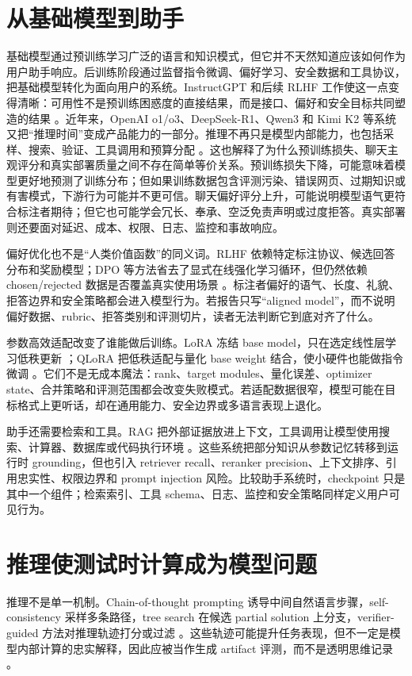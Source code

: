 \documentclass[UTF8,zihao=-4,openany]{ctexbook}
\begin{document}
\section{从基础模型到助手}
基础模型通过预训练学习广泛的语言和知识模式，但它并不天然知道应该如何作为用户助手响应。后训练阶段通过监督指令微调、偏好学习、安全数据和工具协议，把基础模型转化为面向用户的系统。InstructGPT 和后续 RLHF 工作使这一点变得清晰：可用性不是预训练困惑度的直接结果，而是接口、偏好和安全目标共同塑造的结果 \cite{ouyang2022training,bai2022training}。近年来，OpenAI o1/o3、DeepSeek-R1、Qwen3 和 Kimi K2 等系统又把“推理时间”变成产品能力的一部分。推理不再只是模型内部能力，也包括采样、搜索、验证、工具调用和预算分配 \cite{deepseek2025r1,yang2025qwen3,kimi2025k2}。这也解释了为什么预训练损失、聊天主观评分和真实部署质量之间不存在简单等价关系。预训练损失下降，可能意味着模型更好地预测了训练分布；但如果训练数据包含评测污染、错误网页、过期知识或有害模式，下游行为可能并不更可信。聊天偏好评分上升，可能说明模型语气更符合标注者期待；但它也可能学会冗长、奉承、空泛免责声明或过度拒答。真实部署则还要面对延迟、成本、权限、日志、监控和事故响应。

偏好优化也不是“人类价值函数”的同义词。RLHF 依赖特定标注协议、候选回答分布和奖励模型；DPO 等方法省去了显式在线强化学习循环，但仍然依赖 chosen/rejected 数据是否覆盖真实使用场景 \cite{rafailov2023direct}。标注者偏好的语气、长度、礼貌、拒答边界和安全策略都会进入模型行为。若报告只写“aligned model”，而不说明偏好数据、rubric、拒答类别和评测切片，读者无法判断它到底对齐了什么。

参数高效适配改变了谁能做后训练。LoRA 冻结 base model，只在选定线性层学习低秩更新 \cite{hu2021lora}；QLoRA 把低秩适配与量化 base weight 结合，使小硬件也能做指令微调 \cite{dettmers2023qlora}。它们不是无成本魔法：rank、target modules、量化误差、optimizer state、合并策略和评测范围都会改变失败模式。若适配数据很窄，模型可能在目标格式上更听话，却在通用能力、安全边界或多语言表现上退化。

助手还需要检索和工具。RAG 把外部证据放进上下文，工具调用让模型使用搜索、计算器、数据库或代码执行环境 \cite{lewis2020retrieval,yao2023react}。这些系统把部分知识从参数记忆转移到运行时 grounding，但也引入 retriever recall、reranker precision、上下文排序、引用忠实性、权限边界和 prompt injection 风险。比较助手系统时，checkpoint 只是其中一个组件；检索索引、工具 schema、日志、监控和安全策略同样定义用户可见行为。

\section{推理使测试时计算成为模型问题}
推理不是单一机制。Chain-of-thought prompting 诱导中间自然语言步骤，self-consistency 采样多条路径，tree search 在候选 partial solution 上分支，verifier-guided 方法对推理轨迹打分或过滤 \cite{wei2022chain,yao2023tree}。这些轨迹可能提升任务表现，但不一定是模型内部计算的忠实解释，因此应被当作生成 artifact 评测，而不是透明思维记录 \cite{lyu2023faithful}。
\end{document}
